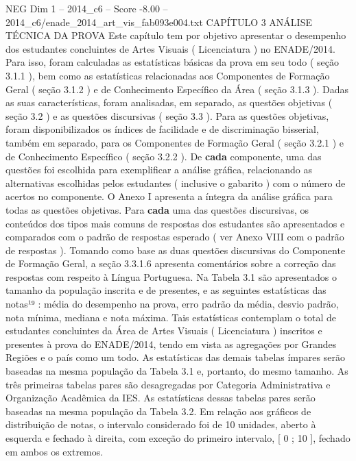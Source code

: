 \begin{textsample}{NEG Dim 1 – 2014\_c6 – Score -8.00 – 2014\_c6/enade\_2014\_art\_vis\_fab093e004.txt}  \label{ex:f1_neg_018}
CAPÍTULO 3 ANÁLISE TÉCNICA DA PROVA Este capítulo tem por objetivo apresentar o desempenho dos estudantes concluintes de Artes Visuais ( Licenciatura ) no ENADE/2014.
Para isso, foram calculadas as estatísticas básicas da prova em seu todo ( seção 3.1.1 ), bem como as estatísticas relacionadas aos Componentes de Formação Geral ( seção 3.1.2 ) e de Conhecimento Específico da Área ( seção 3.1.3 ).
Dadas as suas características, foram analisadas, em separado, as questões objetivas ( seção 3.2 ) e as questões discursivas ( seção 3.3 ).
Para as questões objetivas, foram disponibilizados os índices de facilidade e de discriminação bisserial, também em separado, para os Componentes de Formação Geral ( seção 3.2.1 ) e de Conhecimento Específico ( seção 3.2.2 ).
De \textbf{cada} componente, uma das questões foi escolhida para exemplificar a análise gráfica, relacionando as alternativas escolhidas pelos estudantes ( inclusive o gabarito ) com o número de acertos no componente.
O Anexo I apresenta a íntegra da análise gráfica para todas as questões objetivas.
Para \textbf{cada} uma das questões discursivas, os conteúdos dos tipos mais comuns de respostas dos estudantes são apresentados e comparados com o padrão de respostas esperado ( ver Anexo VIII com o padrão de respostas ).
Tomando como base as duas questões discursivas do Componente de Formação Geral, a seção 3.3.1.6 apresenta comentários sobre a correção das respostas com respeito à Língua Portuguesa.
Na Tabela 3.1 são apresentados o tamanho da população inscrita e de presentes, e as seguintes estatísticas das notas¹⁹ : média do desempenho na prova, erro padrão da média, desvio padrão, nota mínima, mediana e nota máxima.
Tais estatísticas contemplam o total de estudantes concluintes da Área de Artes Visuais ( Licenciatura ) inscritos e presentes à prova do ENADE/2014, tendo em vista as agregações por Grandes Regiões e o país como um todo.
As estatísticas das demais tabelas ímpares serão baseadas na mesma população da Tabela 3.1 e, portanto, do mesmo tamanho.
As três primeiras tabelas pares são desagregadas por Categoria Administrativa e Organização Acadêmica da IES.
As estatísticas dessas tabelas pares serão baseadas na mesma população da Tabela 3.2.
Em relação aos gráficos de distribuição de notas, o intervalo considerado foi de 10 unidades, aberto à esquerda e fechado à direita, com exceção do primeiro intervalo, [ 0 ; 10 ], fechado em ambos os extremos.

\end{textsample}
